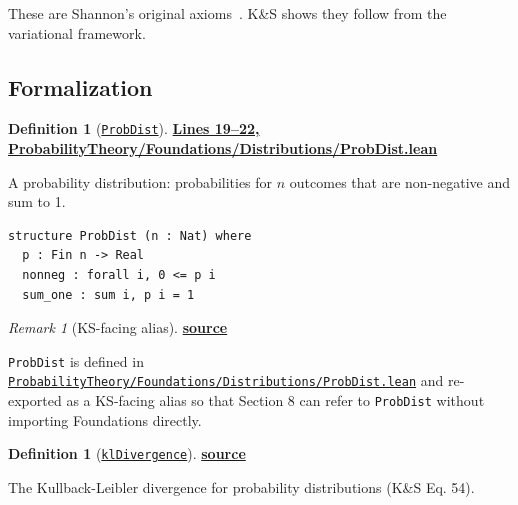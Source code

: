\documentclass[11pt]{article}
\theoremstyle{definition}
\newtheorem{definition}[theorem]{Definition}
\theoremstyle{remark}
\newtheorem{remark}[theorem]{Remark}
\begin{document}
These are Shannon's original axioms~\cite{Shannon1948}. K\&S shows they follow from the variational framework.

\subsection{Formalization}

\begin{definition}[\href{https://github.com/zariuq/ks-foundations-of-inference/blob/main/ProbabilityTheory/Foundations/Distributions/ProbDist.lean\#L19}{\texttt{ProbDist}}]
\textbf{\href{https://github.com/zariuq/ks-foundations-of-inference/blob/main/ProbabilityTheory/Foundations/Distributions/ProbDist.lean\#L19-L22}{Lines 19--22, ProbabilityTheory/Foundations/Distributions/ProbDist.lean}}

A probability distribution: probabilities for $n$ outcomes that are non-negative and sum to 1.
\end{definition}

\begin{lstlisting}[caption={Probability distribution}]
structure ProbDist (n : Nat) where
  p : Fin n -> Real
  nonneg : forall i, 0 <= p i
  sum_one : sum i, p i = 1
\end{lstlisting}

\begin{remark}[KS-facing alias]
\textbf{\href{https://github.com/zariuq/ks-foundations-of-inference/blob/main/KnuthSkilling/Information/InformationEntropy.lean}{source}}

\texttt{ProbDist} is defined in\\
{\footnotesize\href{https://github.com/zariuq/ks-foundations-of-inference/blob/main/ProbabilityTheory/Foundations/Distributions/ProbDist.lean}{\texttt{ProbabilityTheory/Foundations/Distributions/ProbDist.lean}}} and re-exported as a KS-facing alias
so that Section 8 can refer to \texttt{ProbDist} without importing Foundations directly.
\end{remark}

\begin{definition}[\href{https://github.com/zariuq/ks-foundations-of-inference/blob/main/KnuthSkilling/Information/InformationEntropy.lean}{\texttt{klDivergence}}]
\textbf{\href{https://github.com/zariuq/ks-foundations-of-inference/blob/main/KnuthSkilling/Information/InformationEntropy.lean}{source}}

The Kullback-Leibler divergence for probability distributions (K\&S Eq. 54).
\end{definition}
\end{document}
